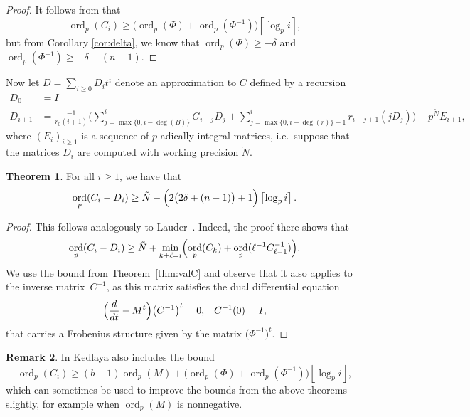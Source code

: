 \documentclass[a4paper,11pt]{article}
\numberwithin{equation}{section}
\providecommand{\floor}[1]{\left\lfloor#1\right\rfloor}   %
\providecommand{\ceil}[1]{\left\lceil#1\right\rceil}   %
\DeclareMathOperator{\ord}{ord}          %
\theoremstyle{definition}
\newtheorem{thm}{Theorem}[section]
\newtheorem{rem}[thm]{Remark}
\begin{document}
\begin{proof}
It follows from \citep[Theorem~{18.3.3}]{Kedlaya2010} that
\begin{equation*}
\ord_p(C_i) \geq \bigl( \ord_p(\Phi) + \ord_p(\Phi^{-1}) \bigr) \ceil{\log_p i},
\end{equation*}
but from Corollary \ref{cor:delta}, we know that $\ord_p(\Phi) \geq -\delta$ and 
$\ord_p(\Phi^{-1}) \geq -\delta-(n-1)$.
\end{proof}

Now let $D=\sum_{i \geq 0} D_i t^i$ denote an approximation to $C$ 
defined by a recursion
\begin{align*}
D_0 &= I \\
D_{i+1} &= \frac{-1}{r_0 (i+1)} \biggl(
    \sum_{j=\max{\{0,i-\deg(B)\}}}^i G_{i-j} D_j + 
    \sum_{j=\max{\{0,i-\deg(r)\}}+1}^i r_{i-j+1} (j D_j) \biggr) + 
    p^{\tilde{N}} E_{i+1},
\end{align*}
where $(E_i)_{i \geq 1}$ is a sequence of $p$-adically integral matrices, i.e.\ suppose that the matrices $D_i$
are computed with working precision $\tilde{N}$.

\begin{thm} \label{thm:errorprop}
For all $i \geq 1$, we have that
\begin{equation*}
\ord_p(C_i - D_i) \geq 
    \tilde{N} - \Bigl(2 \bigl(2 \delta + (n-1)\bigr) + 1\Bigr) \ceil{\log_p i}.
\end{equation*}
\end{thm}

\begin{proof}
This follows analogously to
Lauder~\citep[Theorem~5.1]{Lauder2006}.  
Indeed, the proof there shows that 
\begin{equation*}
\ord_p(C_i - D_i) \geq 
    \tilde{N} + \min_{k+\ell=i} \Bigl(\ord_p(C_k) + 
                                      \ord_p(\ell^{-1} C_{\ell-1}^{-1})\Bigr).
\end{equation*}
We use the bound from Theorem~\ref{thm:valC} and observe that it 
also applies to the inverse matrix~$C^{-1}$, as this matrix satisfies 
the dual differential equation 
\begin{equation} \label{eq:01-GMDE-Dual}
\Bigl(\frac{d}{dt} - M^t\Bigr) \bigl(C^{-1}\bigr)^t = 0, \; \; \; C^{-1}(0)=I,
\end{equation}
that carries a Frobenius structure given by the matrix $\bigl(\Phi^{-1}\bigr)^t$. 
\end{proof}

\begin{rem}
In \citep[Remark~18.3.4]{Kedlaya2010} Kedlaya also includes the bound
\begin{equation*}
\ord_p(C_i) \geq (b - 1) \ord_p(M) 
            + \bigl( \ord_p(\Phi) + \ord_p(\Phi^{-1}) \bigr) \floor{\log_p i},
\end{equation*}
which can sometimes be used to improve the bounds from the above theorems slightly, 
for example when $\ord_p(M)$ is nonnegative.
\end{rem}
\end{document}
